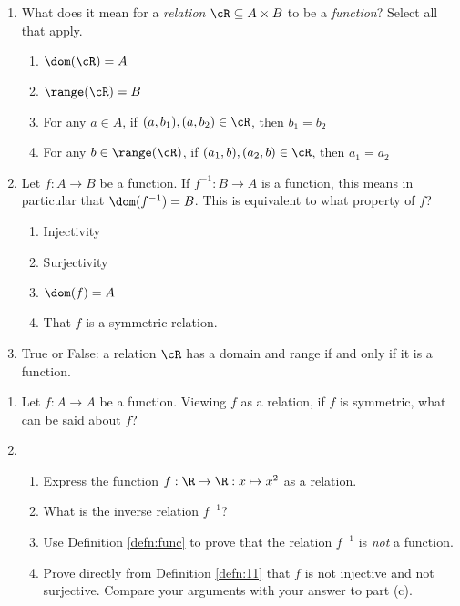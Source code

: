\pagestyle{empty}


\begin{enumerate}
  \item What does it mean for a \emph{relation} $\cR\subseteq A\times B$ to be a \emph{function}? Select all that apply.
  \begin{enumerate}
    \item $\dom(\cR)=A$
    \item $\range(\cR)=B$
    \item For any $a\in A$, if $(a,b_1),(a,b_2)\in\cR$, then $b_1=b_2$
    \item For any $b\in\range(\cR)$, if $(a_1,b),(a_2,b)\in\cR$, then $a_1=a_2$
  \end{enumerate}
    
  \item Let $f:A\to B$ be a function. If $f^{-1}:B\to A$ is a function, this means in particular that $\dom(f^{-1})=B$. This is equivalent to what property of $f$?
  \begin{enumerate}
		\item Injectivity
		\item Surjectivity
    \item $\dom(f)=A$
    \item That $f$ is a symmetric relation.
  \end{enumerate}
    
  \item True or False: a relation $\cR$ has a domain and range if and only if it is a function.
\end{enumerate}



\begin{enumerate}
	\item Let $f:A\to A$ be a function. Viewing $f$ as a relation, if $f$ is symmetric, what can be said about $f$? 

	\item\begin{enumerate}
    \item Express the function $f:\R\to\R:x\mapsto x^2$ as a relation.
    \item What is the inverse relation $f^{-1}$?
    \item Use Definition \ref*{defn:func} to prove that the relation $f^{-1}$ is \emph{not} a function.
    \item Prove directly from Definition \ref*{defn:11} that $f$ is not injective and not surjective. Compare your arguments with your answer to part (c).
  \end{enumerate}
\end{enumerate}

